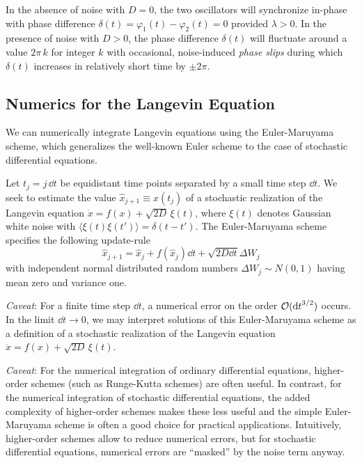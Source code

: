 \documentclass{notebook}
\newcommand{\Caveat}{\textit{Caveat}}
\begin{document}
In the absence of noise with $D=0$, the two oscillators will synchronize in-phase 
with phase difference $\delta(t)=\varphi_1(t)-\varphi_2(t)=0$ provided $\lambda>0$. 
In the presence of noise with $D>0$, the phase difference $\delta(t)$ will fluctuate around  a value $2\pi\,k$ for integer $k$ with occasional, noise-induced \textit{phase slips} during which  $\delta(t)$ increases in relatively short time by $\pm 2\pi$.


\subsection*{Numerics for the Langevin Equation}

We can numerically integrate Langevin equations using the Euler-Maruyama scheme, 
which generalizes the well-known Euler scheme to the case of stochastic differential equations.

\begin{theorem}
Let $t_j=j\,\dd{t}$ be equidistant time points separated by a small time step $\dd{t}$.
We seek to estimate the value
$\hat{x}_{j+1} \equiv x(t_j)$
of a stochastic realization of the Langevin equation 
$\dot{x} = f(x) + \sqrt{2D} \, \xi(t)$, 
where $\xi(t)$ denotes Gaussian white noise with $\langle \xi(t)\xi(t')\rangle = \delta(t-t')$.
The Euler-Maruyama scheme specifies the following update-rule
	\begin{equation}
	\hat{x}_{j+1} = \hat{x}_j + f(\hat{x}_j) \dd{t} + \sqrt{2 D \dd{t}} \Delta W_j
	\end{equation}
	with independent normal distributed random numbers $\Delta W_j \sim N(0,1)$ having mean zero and variance one.
\end{theorem}

\Caveat: 
For a finite time step $\dd{t}$, a numerical error on the order $\mathcal{O}(\dd{t}^{3/2})$ occurs.
In the limit $\dd{t}\rightarrow 0$, we may interpret solutions of this Euler-Maruyama scheme as a definition of a stochastic realization of the Langevin equation $\dot{x} = f(x) + \sqrt{2D} \, \xi(t)$.

\Caveat:
For the numerical integration of ordinary differential equations, higher-order schemes (such as Runge-Kutta schemes) are often useful. 
In contrast, for the numerical integration of stochastic differential equations, 
the added complexity of higher-order schemes makes these less useful and the simple Euler-Maruyama scheme is often a good choice for practical applications. 
Intuitively, higher-order schemes allow to reduce numerical errors, 
but for stochastic differential equations, numerical errors are ``masked'' by the noise term anyway.
\end{document}

